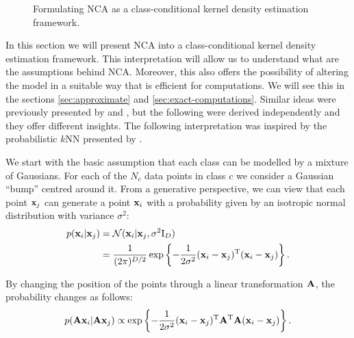 \begin{figure}
  \centering
  \caption{Formulating NCA as a class-conditional kernel density estimation framework.}
  \label{fig:kde}
\end{figure}

In this section we will present NCA into a class-conditional kernel density estimation framework. This interpretation will allow us to understand what are the assumptions behind NCA. Moreover, this also offers the possibility of altering the model in a suitable way that is efficient for computations. We will see this in the sections \ref{sec:approximate} and \ref{sec:exact-computations}. Similar ideas were previously presented by and , but the following were derived independently and they offer different insights. The following interpretation was inspired by the probabilistic $k$NN presented by \citet{barber2011}.

We start with the basic assumption that each class can be modelled by a mixture of Gaussians. For each of the $N_c$ data points in class $c$ we consider a Gaussian ``bump'' centred around it. From a generative perspective, we can view that each point $\mathbf{x}_j$ can generate a point $\mathbf{x}_i$ with a probability given by an isotropic normal distribution with variance $\sigma^2$:
\begin{align}
	p(\mathbf{x}_i|\mathbf{x}_j) &= \mathcal{N}(\mathbf{x}_i|\mathbf{x}_j, \sigma^2\mathrm{I}_D) \\
				   &= \frac{1}{(2\pi)^{D/2}}\exp \left\{-\frac{1}{2\sigma^2} (\mathbf{x}_i - \mathbf{x}_j)^\mathrm{T}(\mathbf{x}_i - \mathbf{x}_j)\right\}.
\end{align}

By changing the position of the points through a linear transformation $\mathbf{A}$, the probability changes as follows:
\begin{align}
	p(\mathbf{A}\mathbf{x}_i|\mathbf{A}\mathbf{x}_j) \propto \exp \left\{-\frac{1}{2\sigma^2} (\mathbf{x}_i - \mathbf{x}_j)^\mathrm{T}\mathbf{A}^\mathrm{T}\mathbf{A}(\mathbf{x}_i - \mathbf{x}_j)\right\}.
\end{align}

